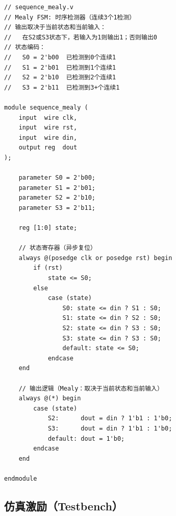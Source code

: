 \documentclass[12pt,a4paper]{article}
\begin{document}
\begin{lstlisting}[caption={sequence\_mealy.v --- Mealy型时序检测器}, label=lst:mealy]
// sequence_mealy.v
// Mealy FSM: 时序检测器（连续3个1检测）
// 输出取决于当前状态和当前输入：
//   在S2或S3状态下，若输入为1则输出1；否则输出0
// 状态编码：
//   S0 = 2'b00  已检测到0个连续1
//   S1 = 2'b01  已检测到1个连续1
//   S2 = 2'b10  已检测到2个连续1
//   S3 = 2'b11  已检测到3+个连续1

module sequence_mealy (
    input  wire clk,
    input  wire rst,
    input  wire din,
    output reg  dout
);

    parameter S0 = 2'b00;
    parameter S1 = 2'b01;
    parameter S2 = 2'b10;
    parameter S3 = 2'b11;

    reg [1:0] state;

    // 状态寄存器（异步复位）
    always @(posedge clk or posedge rst) begin
        if (rst)
            state <= S0;
        else
            case (state)
                S0: state <= din ? S1 : S0;
                S1: state <= din ? S2 : S0;
                S2: state <= din ? S3 : S0;
                S3: state <= din ? S3 : S0;
                default: state <= S0;
            endcase
    end

    // 输出逻辑（Mealy：取决于当前状态和当前输入）
    always @(*) begin
        case (state)
            S2:      dout = din ? 1'b1 : 1'b0;
            S3:      dout = din ? 1'b1 : 1'b0;
            default: dout = 1'b0;
        endcase
    end

endmodule
\end{lstlisting}

\subsection{仿真激励（Testbench）}
\end{document}
